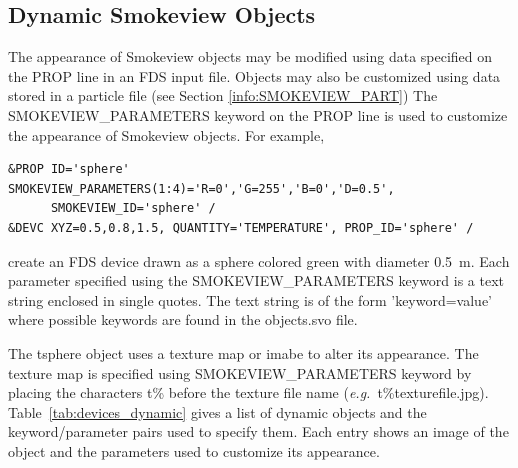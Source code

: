 \subsection{Dynamic Smokeview Objects}
\label{info:SMOKEVIEW_PARAMETERS}

The appearance of Smokeview objects may be modified using data specified on the {\ct PROP} line in an FDS input file. Objects may also be customized using data stored in a particle file (see Section \ref{info:SMOKEVIEW_PART}) The {\ct SMOKEVIEW\_PARAMETERS} keyword on the {\ct PROP} line is used to customize the appearance of Smokeview objects.  For example,
\begin{lstlisting}
&PROP ID='sphere' SMOKEVIEW_PARAMETERS(1:4)='R=0','G=255','B=0','D=0.5',
      SMOKEVIEW_ID='sphere' /
&DEVC XYZ=0.5,0.8,1.5, QUANTITY='TEMPERATURE', PROP_ID='sphere' /
\end{lstlisting}
create an FDS device drawn as a sphere colored green with diameter 0.5~m. Each parameter specified using the {\ct SMOKEVIEW\_PARAMETERS} keyword is a text string enclosed in single quotes.  The text string is of the form {\ct 'keyword=value'} where possible keywords are found in the {\ct objects.svo} file.

The {\ct tsphere} object uses a texture map or imabe to alter its appearance. The texture map is specified using {\ct SMOKEVIEW\_PARAMETERS} keyword by placing the characters {\ct t\%} before the texture file name ({\em e.g.}\ {\ct t\%texturefile.jpg}). Table~\ref{tab:devices_dynamic} gives a list of dynamic objects and the keyword/parameter pairs used to specify them. Each entry shows an image of the object and the parameters used to customize its appearance.

